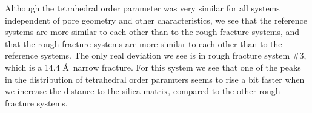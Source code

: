 Although the tetrahedral order parameter was very similar for all systems independent of pore geometry and other characteristics, we see that the reference systems are more similar to each other than to the rough fracture systems, and that the rough fracture systems are more similar to each other than to the reference systems. The only real deviation we see is in rough fracture system \#3, which is a 14.4 \AA\ narrow fracture. For this system we see that one of the peaks in the distribution of tetrahedral order paramters seems to rise a bit faster when we increase the distance to the silica matrix, compared to the other rough fracture systems.






